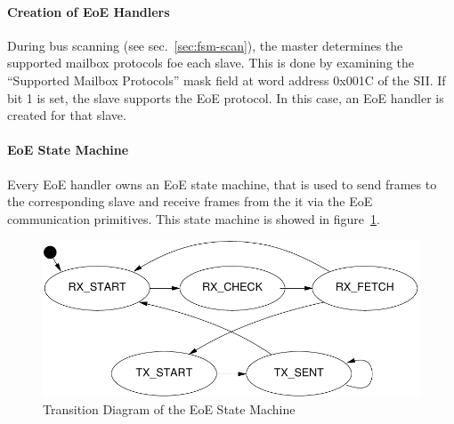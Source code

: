 \documentclass[a4paper,12pt,BCOR6mm,bibtotoc,idxtotoc]{scrbook}
\begin{document}
\paragraph{Creation of EoE Handlers}

During bus scanning (see sec.~\ref{sec:fsm-scan}), the master determines the
supported mailbox protocols foe each slave. This is done by examining the
``Supported Mailbox Protocols'' mask field at word address 0x001C of the
SII. If bit 1 is set, the slave supports the EoE protocol. In this
case, an EoE handler is created for that slave.

\paragraph{EoE State Machine}

Every EoE handler owns an EoE state machine, that is used to send frames to
the corresponding slave and receive frames from the it via the EoE
communication primitives. This state machine is showed in
figure~\ref{fig:fsm-eoe}.

\begin{figure}[htbp]
  \centering
  \includegraphics[width=.7\textwidth]{images/fsm-eoe} %
  \caption{Transition Diagram of the EoE State Machine}
  \label{fig:fsm-eoe}
\end{figure}

\end{document}
